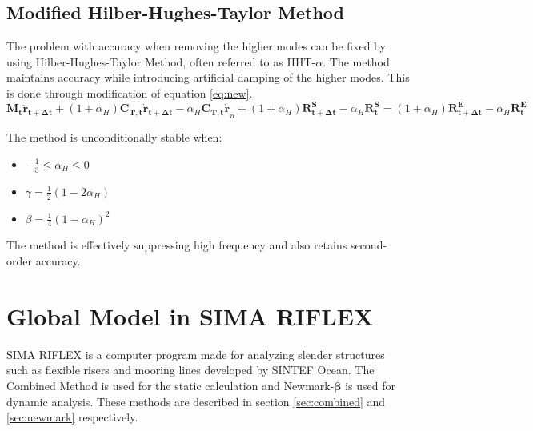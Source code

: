 \subsection{Modified Hilber-Hughes-Taylor Method}
\label{sec:HHT}
The problem with accuracy when removing the higher modes can be fixed by using Hilber-Hughes-Taylor Method, often referred to as HHT-$\alpha$. The method maintains accuracy while introducing artificial damping of the higher modes. This is done through modification of equation \ref{eq:new}. 
\begin{equation}
   \boldsymbol{M_t \ddot{r}_{t+\Delta t}} + (1+\alpha_H)\boldsymbol{C_{T,t}\dot{r}_{t+\Delta t}}  -\alpha_H\boldsymbol{C_{T,t}\dot{r}}_{n}+ (1+\alpha_H)\boldsymbol{R_{t+\Delta t}^S}-\alpha_H\boldsymbol{R_{t}^S}=(1+\alpha_H) \boldsymbol{R_{t+\Delta t}^E}-\alpha_H\boldsymbol{R_{t}^E}
\end{equation}

The method is unconditionally stable when:
\begin{itemize}
    \item $-\frac{1}{3} \leq \alpha_H \leq 0 $
    \item  $\gamma = \frac{1}{2} (1-2 \alpha_H)$
    \item  $\beta = \frac{1}{4} (1- \alpha_H)^2$
\end{itemize}

\noindent The method is effectively suppressing high frequency and also retains second-order accuracy. \cite{Mathisen1990}

\section{Global Model in SIMA RIFLEX}
SIMA RIFLEX is a computer program made for analyzing slender structures such as flexible risers and mooring lines developed by SINTEF Ocean. The Combined Method is used for the static calculation and Newmark-$\boldsymbol{\beta}$ is used for dynamic analysis. These methods are described in section \ref{sec:combined} and \ref{sec:newmark} respectively. 



